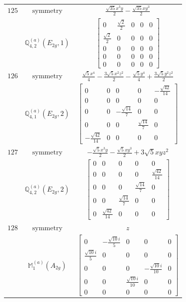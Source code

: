 \documentclass[fleqn,8pt,landscape]{jsarticle}
\begin{document}
\begin{longtable}{ccc}
$ 125 $ & $ \text{symmetry} $ & $ \frac{\sqrt{35} x^{3} y}{2} - \frac{\sqrt{35} x y^{3}}{2} $ \\
$  $ & $ \mathbb{Q}_{4,2}^{(a)}(E_{2g},1) $ & $ \begin{bmatrix} 0 & \frac{\sqrt{2}}{2} & 0 & 0 & 0 \\ \frac{\sqrt{2}}{2} & 0 & 0 & 0 & 0 \\ 0 & 0 & 0 & 0 & 0 \\ 0 & 0 & 0 & 0 & 0 \\ 0 & 0 & 0 & 0 & 0 \end{bmatrix} $ \\ \hline
$ 126 $ & $ \text{symmetry} $ & $ \frac{\sqrt{5} x^{4}}{4} - \frac{3 \sqrt{5} x^{2} z^{2}}{2} - \frac{\sqrt{5} y^{4}}{4} + \frac{3 \sqrt{5} y^{2} z^{2}}{2} $ \\
$  $ & $ \mathbb{Q}_{4,1}^{(a)}(E_{2g},2) $ & $ \begin{bmatrix} 0 & 0 & 0 & 0 & - \frac{\sqrt{42}}{14} \\ 0 & 0 & 0 & 0 & 0 \\ 0 & 0 & - \frac{\sqrt{14}}{7} & 0 & 0 \\ 0 & 0 & 0 & \frac{\sqrt{14}}{7} & 0 \\ - \frac{\sqrt{42}}{14} & 0 & 0 & 0 & 0 \end{bmatrix} $ \\ \hline
$ 127 $ & $ \text{symmetry} $ & $ - \frac{\sqrt{5} x^{3} y}{2} - \frac{\sqrt{5} x y^{3}}{2} + 3 \sqrt{5} x y z^{2} $ \\
$  $ & $ \mathbb{Q}_{4,2}^{(a)}(E_{2g},2) $ & $ \begin{bmatrix} 0 & 0 & 0 & 0 & 0 \\ 0 & 0 & 0 & 0 & \frac{\sqrt{42}}{14} \\ 0 & 0 & 0 & \frac{\sqrt{14}}{7} & 0 \\ 0 & 0 & \frac{\sqrt{14}}{7} & 0 & 0 \\ 0 & \frac{\sqrt{42}}{14} & 0 & 0 & 0 \end{bmatrix} $ \\ \hline
$ 128 $ & $ \text{symmetry} $ & $ z $ \\
$  $ & $ \mathbb{M}_{1}^{(a)}(A_{2g}) $ & $ \begin{bmatrix} 0 & - \frac{\sqrt{10} i}{5} & 0 & 0 & 0 \\ \frac{\sqrt{10} i}{5} & 0 & 0 & 0 & 0 \\ 0 & 0 & 0 & - \frac{\sqrt{10} i}{10} & 0 \\ 0 & 0 & \frac{\sqrt{10} i}{10} & 0 & 0 \\ 0 & 0 & 0 & 0 & 0 \end{bmatrix} $ \\ \hline

\end{longtable}
\end{document}
